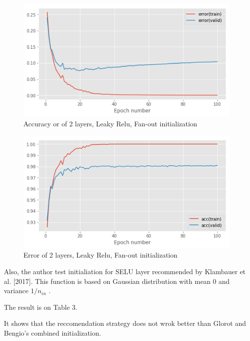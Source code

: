 \documentclass{article}
\begin{document}
\begin{figure}[tb]
\vskip 5mm
\begin{center}
\centerline{\includegraphics[width=\columnwidth]{faninn2e.png}}
\caption{Accuracy or of 2 layers, Leaky Relu, Fan-out initialization}
\label{fig:sample-graph}
\end{center}
\vskip -5mm
\end{figure}
\begin{figure}[tb]
\vskip 5mm
\begin{center}
\centerline{\includegraphics[width=\columnwidth]{faninn2aa.png}}
\caption{Error of 2 layers, Leaky Relu, Fan-out initialization}
\label{fig:sample-graph}
\end{center}
\vskip -5mm
\end{figure}

Also, the author test initialiation for SELU layer recommended by Klambauer et al. [2017]. This function is based on Gaussian distribution with mean 0 and variance $1/n_{in}$ .

The result is on Table 3.

It shows that the reccomendation strategy does not wrok better than Glorot and Bengio's combined initialization.
\end{document}
